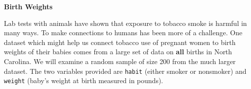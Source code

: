\def\theTopic{Birth Weights }
\def\dayNum{15 }

\begin{center}
\vspace*{.1in}
{\bf {\large Birth Weights}}
\end{center}
\vspace{-.1in}

Lab tests with animals have shown that exposure to tobacco smoke is
harmful in many ways.  To make connections to humans has been more of
a challenge.  One dataset which might help us connect tobacco use of
pregnant women to birth weights of their babies comes from a large set
of data on {\bf all} births in North Carolina.  We will examine a random sample
of size 200 from the much larger dataset. The two variables provided
are {\tt habit} (either smoker or nonsmoker) and {\tt weight} (baby's weight at
birth measured in pounds). 



